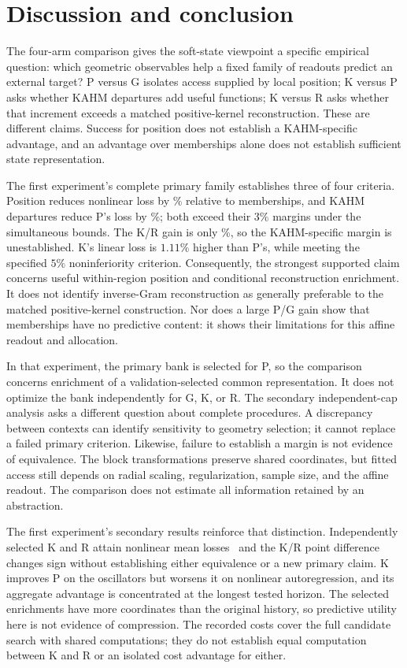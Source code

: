 \section{Discussion and conclusion}\label{sec:discussion}

The four-arm comparison gives the soft-state viewpoint a specific
empirical question: which geometric observables help a fixed family of
readouts predict an external target? P versus G isolates access supplied
by local position; K versus P asks whether KAHM departures add useful
functions; K versus R asks whether that increment exceeds a matched
positive-kernel reconstruction. These are different claims. Success
for position does not establish a KAHM-specific advantage, and an
advantage over memberships alone does not establish sufficient state
representation.

The first experiment's complete primary family establishes three of
four criteria.
Position reduces nonlinear loss by \SAGainPG\% relative to
memberships, and KAHM departures reduce P's loss by \SAGainKP\%;
both exceed their $3\%$ margins under the simultaneous bounds.
The K/R gain is only \SAGainKR\%, so the KAHM-specific margin is
unestablished. K's linear loss is $1.11\%$ higher than P's, while
meeting the specified $5\%$ noninferiority criterion. Consequently,
the strongest supported claim concerns useful within-region position
and conditional reconstruction enrichment. It does not identify
inverse-Gram reconstruction as generally preferable to the matched
positive-kernel construction. Nor does a large P/G gain show that
memberships have no predictive content: it shows their limitations
for this affine readout and allocation.

In that experiment, the primary bank is selected for P, so the comparison concerns
enrichment of a validation-selected common representation. It does
not optimize the bank independently for G, K, or R. The secondary
independent-cap analysis asks a different question about complete
procedures. A discrepancy between contexts can identify sensitivity
to geometry selection; it cannot replace a failed primary criterion.
Likewise, failure to establish a margin is not evidence of equivalence.
The block transformations preserve shared coordinates, but fitted
access still depends on radial scaling, regularization, sample size,
and the affine readout. The comparison does not estimate all
information retained by an abstraction.

The first experiment's secondary results reinforce that distinction. Independently
selected K and R attain nonlinear mean losses
\SALossIndependentNonlinearK\ and \SALossIndependentNonlinearR\;
the K/R point difference changes sign without establishing either
equivalence or a new primary claim. K improves P on the oscillators
but worsens it on nonlinear autoregression, and its aggregate
advantage is concentrated at the longest tested horizon. The
selected enrichments have more coordinates than the original
history, so predictive utility here is not evidence of compression.
The recorded costs cover the full candidate search with shared
computations; they do not establish equal computation between K
and R or an isolated cost advantage for either.

